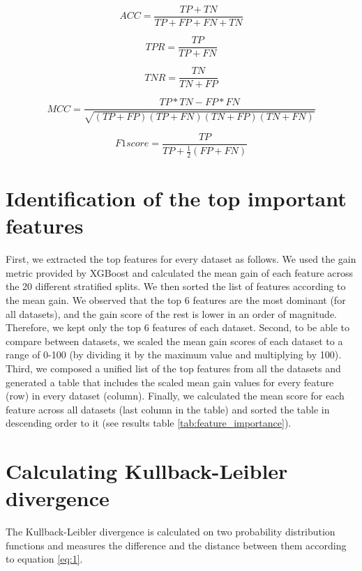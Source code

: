 \begin{equation}
ACC = \frac{TP + TN}{TP + FP + FN + TN} \label{eq:acc}
\end{equation}

\begin{equation}
TPR = \frac{TP}{TP + FN} \label{eq:tpr}
\end{equation}

\begin{equation}
TNR = \frac{TN}{TN + FP} \label{eq:tnr}
\end{equation}

\begin{equation}
MCC = \frac{TP*TN-FP*FN}{\sqrt{(TP+FP)(TP+FN)(TN+FP)(TN+FN)}}
\end{equation}

\begin{equation} \label{eq:f1}
F1 score = \frac{TP}{TP+\frac{1}{2}(FP+FN)}
\end{equation}



\section{Identification of the top important features} \label{ident_top_features}
First, we extracted the top features for every dataset as follows. We used the gain metric provided by XGBoost and calculated the mean gain of each feature across the 20 different stratified splits. We then sorted the list of features according to the mean gain. We observed that the top 6 features are the most dominant (for all datasets), and the gain score of the rest is lower in an order of magnitude. Therefore, we kept only the top 6 features of each dataset.  
Second, to be able to compare between datasets, we scaled the mean gain scores of each dataset to a range of 0-100 (by dividing it by the maximum value and multiplying by 100). 
Third, we composed a unified list of the top features from all the datasets and generated a table that includes the scaled mean gain values for every feature (row) in every dataset (column). Finally, we calculated the mean score for each feature across all datasets (last column in the table) and sorted the table in descending order to it (see results table \ref{tab:feature_importance}).

\section{Calculating Kullback-Leibler divergence}
The Kullback-Leibler divergence is calculated on two probability distribution functions and measures the difference and the distance between them according to equation \ref{eq:1}.

